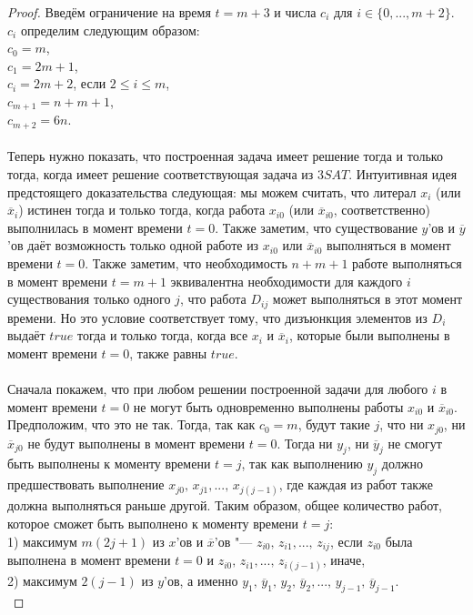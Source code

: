 \documentclass[a4paper,12pt]{article}
\theoremstyle{plain} %
\theoremstyle{definition} %
\theoremstyle{remark} %
\begin{document}
\begin{proof}
	Введём ограничение на время $t = m + 3$ и числа $c_i$ для $i \in \{0, ..., m + 2\}$. $c_i$ определим следующим образом:\\
	$c_0 = m$,\\
	$c_1 = 2m + 1$,\\
	$c_i = 2m + 2$, если $2 \le i \le m$,\\
	$c_{m + 1} = n + m + 1$,\\
	$c_{m + 2} = 6n$.\\ \\
	Теперь нужно показать, что построенная задача имеет решение тогда и только тогда, когда имеет решение соответствующая задача из $3SAT$. Интуитивная идея предстоящего доказательства следующая: мы можем считать, что литерал $x_i$ (или $\overline{x}_i$) истинен тогда и только тогда, когда работа $x_{i0}$ (или $\overline{x}_{i0}$, соответственно) выполнилась в момент времени $t = 0$. Также заметим, что существование $y$'ов и $\overline{y}$'ов даёт возможность только одной работе из $x_{i0}$ или $\overline{x}_{i0}$ выполняться в момент времени $t = 0$. Также заметим, что необходимость $n + m + 1$ работе выполняться в момент времени $t = m + 1$ эквивалентна необходимости для каждого $i$ существования только одного $j$, что работа $D_{ij}$ может выполняться в этот момент времени. Но это условие соответствует тому, что дизъюнкция элементов из $D_i$ выдаёт $true$ тогда и только тогда, когда все $x_i$ и $\overline{x}_i$, которые были выполнены в момент времени $t = 0$, также равны $true$.\\ \\
	Сначала покажем, что при любом решении построенной задачи для любого $i$ в момент времени $t = 0$ не могут быть одновременно выполнены работы $x_{i0}$ и $\overline{x}_{i0}$. Предположим, что это не так. Тогда, так как $c_0 = m$, будут такие $j$, что ни $x_{j0}$, ни $\overline{x}_{j0}$ не будут выполнены в момент времени $t = 0$. Тогда ни $y_j$, ни $\overline{y}_j$ не смогут быть выполнены к моменту времени $t = j$, так как выполнению $y_j$ должно предшествовать выполнение $x_{j0}, \, x_{j1}, ..., \, x_{j(j - 1)}$, где каждая из работ также должна выполняться раньше другой. Таким образом, общее количество работ, которое сможет быть выполнено к моменту времени $t = j$:\\
	1) максимум $m(2j + 1)$ из $x$'ов и $\overline{x}$'ов "--- $z_{i0}, \, z_{i1}, ..., \, z_{ij}$, если $z_{i0}$ была выполнена в момент времени $t = 0$ и $z_{i0}, \, z_{i1}, ..., \, z_{i(j - 1)}$, иначе,\\
	2) максимум $2(j - 1)$ из $y$'ов, а именно $y_1, \, \overline{y}_1, \, y_2, \, \overline{y}_2, ..., \, y_{j - 1}, \, \overline{y}_{j - 1}$.\\

\end{proof}
\end{document}

